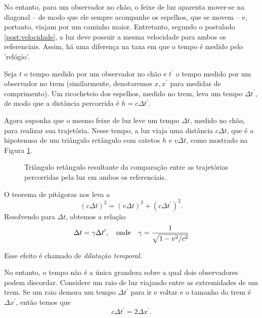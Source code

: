 No entanto, para um observador no chão, o feixe de luz aparenta mover-se na diagonal -- de modo que ele sempre acompanhe os espelhos, que se movem -- e, portanto, viajam por um caminho maior. Entretanto, segundo o postulado \ref{post:velocidade}, a luz deve possuir a mesma velocidade para ambos os referenciais. Assim, há uma diferença na taxa em que o tempo é medido pelo 'relógio'.

Seja $t$ o tempo medido por um observador no chão e $t^\prime$ o tempo medido por um observador no trem (similarmente, denotaremos $x, x^\prime$ para medidas de comprimento). Um ricocheteio dos espelhos, medido no trem, leva um tempo $\Delta t^\prime$, de modo que a distância percorrida é $h = c\Delta t^\prime$.

Agora suponha que o mesmo feixe de luz leve um tempo $\Delta t$, medido no chão, para realizar sua trajetória. Nesse tempo, a luz viaja uma distância $c\Delta t$, que é a hipotenusa de um triângulo retângulo com catetos $h$ e $v\Delta t$, como mostrado na Figura \ref{fig:Pitagoras}.
\begin{figure}[ht]
    \centering
    \caption{Triângulo retângulo resultante da comparação entre as trajetórias percorridas pela luz em ambos os referenciais.}
    \label{fig:Pitagoras}
\end{figure}

O teorema de pitágoras nos leva a 
\[
\left(c\Delta t\right)^2 = \left(v\Delta t\right)^2 + \left( c \Delta t^\prime \right) ^2 .
\]
Resolvendo para $\Delta t$, obtemos a relação
\begin{equation}\label{eq:DilatacaoTemporal}
    \Delta t = \gamma\Delta t^\prime, \qq{onde} \gamma=\frac{1}{\sqrt{1-v^2/c^2}}
\end{equation}

Esse efeito é chamado de \textit{dilatação temporal}.

No entanto, o tempo não é a única grandeza sobre a qual dois observadores podem discordar. Considere um raio de luz viajando entre as extremidades de um trem. Se um raio demora um tempo $\Delta t^\prime$ para ir e voltar e o tamanho do trem é $\Delta x^\prime$, então temos que 
\begin{equation}\label{eq:RelacaoXlinhaTlinha}
    c\Delta t^\prime = 2\Delta x^\prime .
\end{equation}



